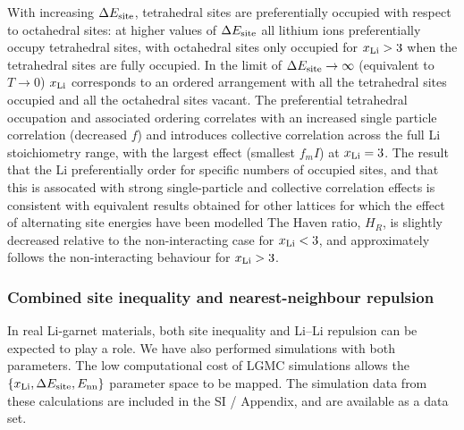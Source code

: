 \documentclass[aps,prb,twocolumn,superscriptaddress,reprint]{revtex4-1}
\newcommand{\xLi}{x_\m{Li}}
\begin{document}
With increasing $\Delta E_{\mathrm{site}}$, tetrahedral sites are preferentially occupied with respect to octahedral sites: at higher values of $\Delta E_{\mathrm{site}}$ all lithium ions preferentially occupy tetrahedral sites, with octahedral sites only occupied for $\xLi>3$ when the tetrahedral sites are fully occupied. 
In the limit of $\Delta E_{\mathrm{site}}\to\infty$ (equivalent to $T\to0$) $\xLi$ corresponds to an ordered arrangement with all the tetrahedral sites occupied and all the octahedral sites vacant. 
The preferential tetrahedral occupation and associated ordering correlates with an increased single particle correlation (decreased $f$) and introduces collective correlation across the full Li stoichiometry range, with the largest effect (smallest $f_m{I}$) at $\xLi=3$. 
The result that the Li preferentially order for specific numbers of occupied sites, and that this is assocated with strong single-particle and collective correlation effects is consistent with equivalent results obtained for other lattices for which the effect of alternating site energies have been modelled  The Haven ratio, $H_R$, is slightly decreased relative to the non-interacting case for $\xLi<3$, and approximately follows the non-interacting behaviour for $\xLi>3$.

\subsubsection{Combined site inequality and nearest-neighbour repulsion}
In real Li-garnet materials, both site inequality and Li--Li repulsion can be expected to play a role. 
We have also performed simulations with both parameters. 
The low computational cost of LGMC simulations allows the $\left\{\xLi, \Delta E_\m{site}, E_\m{nn}\right\}$ parameter space to be mapped. 
The simulation data from these calculations are included in the SI / Appendix, and are available as a data set. 
\end{document}
